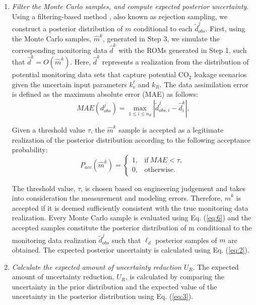 \documentclass[a4paper,fleqn]{cas-sc}
\begin{document}
\begin{enumerate}[Step 1.]
\item \textit{Filter the Monte Carlo samples, and compute expected posterior uncertainty}. Using a filtering-based method \citep{Caers2011}, also known as rejection sampling, we construct a posterior distribution of $m$ conditional to each $\widetilde{d}_{obs}^j$. First, using the Monte Carlo samples, $\hat{m}^k$, generated in Step 3, we simulate the corresponding monitoring data $\hat{d}^k$ with the ROMs generated in Step 1, such that $\hat{d}^k=O(\hat{m}^k)$. Here, $\hat{d}^k$ represents a realization from the distribution of potential monitoring data sets that capture potential CO$_2$ leakage scenarios given the uncertain input parameters $k_v^\ell$ and $k_R$. The data assimilation error is defined as the maximum absolute error (MAE) as follows:
\begin{equation} \label{eq:5}
    MAE(d^j_{obs}) = \max\limits_{1\leq i \leq n_d} | \widetilde{d}^j_{obs,i} - \hat{d}^k_i | .
\end{equation}

Given a threshold value $\tau$, the $\hat{m}^k$ sample is accepted as a legitimate realization of the posterior distribution according to the following acceptance probability:
\begin{equation} \label{eq:6}
    P_{acc}(\hat{m}^k) = 
    \begin{cases}
      1, & \text{if}\ MAE<\tau ,\\
      0, & \text{otherwise}.
    \end{cases}
\end{equation}

The threshold value, $\tau$, is chosen based on engineering judgement and takes into consideration the measurement and modeling errors. Therefore, $\hat{m}^k$ is accepted if it is deemed sufficiently consistent with the true monitoring data realization. Every Monte Carlo sample is evaluated using Eq. (\ref{eq:6}) and the accepted samples constitute the posterior distribution of m conditional to the monitoring data realization $\widetilde{d}^j_{obs}$ such that $\ell_d$ posterior samples of $m$ are obtained. The expected posterior uncertainty is calculated using Eq. (\ref{eq:2}). 

\item \textit{Calculate the expected amount of uncertainty reduction $U_R$}. The expected amount of uncertainty reduction, $U_R$, is calculated by comparing the uncertainty in the prior distribution and the expected value of the uncertainty in the posterior distribution using Eq. (\ref{eq:3}). 


\end{enumerate}
\end{document}
